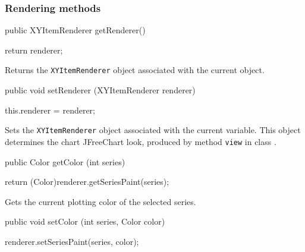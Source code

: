 \subsubsection*{Rendering methods}

\begin{code}

   public XYItemRenderer getRenderer() \begin{hide} {
      return renderer;
   }\end{hide}
\end{code}
\begin{tabb}
   Returns the \texttt{XYItemRenderer} object associated with the current object.
\end{tabb}
\begin{htmlonly}
\end{htmlonly}
\begin{code}

   public void setRenderer (XYItemRenderer renderer) \begin{hide} {
      this.renderer = renderer;
   }\end{hide}
\end{code}
\begin{tabb}
   Sets the \texttt{XYItemRenderer} object associated with the current variable.
   This object determines the chart JFreeChart look, produced by method
  \texttt{view} in class
   .
\end{tabb}
\begin{htmlonly}
\end{htmlonly}
\begin{code}

   public Color getColor (int series) \begin{hide} {
      return (Color)renderer.getSeriesPaint(series);
   }\end{hide}
\end{code}
\begin{tabb}
   Gets the current plotting color of the selected series.
\end{tabb}
\begin{htmlonly}
\end{htmlonly}
\begin{code}

   public void setColor (int series, Color color) \begin{hide} {
      renderer.setSeriesPaint(series, color);
   }\end{hide}
\end{code}
